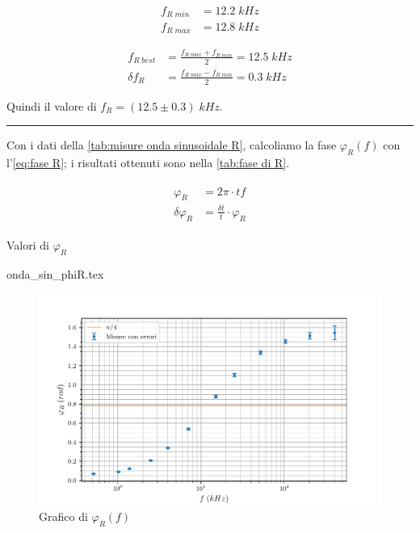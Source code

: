 \documentclass[11pt, a4paper]{article}
\numberwithin{equation}{section} %
\begin{document}
\begin{align*}
    f_{R \; min} &= 12.2 \; kHz \\
    f_{R \; max} &= 12.8 \; kHz
\end{align*}

\begin{align*}
    f_{R \; best} &= \frac{f_{R \; max} + f_{R \; min}}{2} = 12.5  \; kHz \\
    \delta f_{R} &= \frac{f_{R \; max} - f_{R \; min}}{2} = 0.3 \; kHz
\end{align*}

Quindi il valore di \(f_{R} = (12.5 \pm 0.3) \; kHz\).

\rule{\textwidth}{1pt}

Con i dati della \autoref{tab:misure onda sinusoidale R}, calcoliamo la fase $\varphi_{R}(f)$ con l'\autoref{eq:fase R}; i risultati ottenuti sono nella \autoref{tab:fase di R}.

\begin{align} \label{eq:fase R}
    \begin{split}
        \varphi_{R} &= 2\pi \cdot tf \\
        \delta \varphi_{R} &= \frac{\delta t}{t} \cdot \varphi_{R}
    \end{split}
\end{align}

\begin{table}[ht!]
    \centering
    \caption{Valori di $\varphi_{R}$}
    {onda_sin_phiR.tex}
    \label{tab:fase di R}
\end{table}


\begin{figure}[ht!]
    \includegraphics{onda_sin_phi(f)_R.pdf}
    \caption{Grafico di $\varphi_{R}(f)$}
    \label{fig:fase R}
\end{figure}
\end{document}
